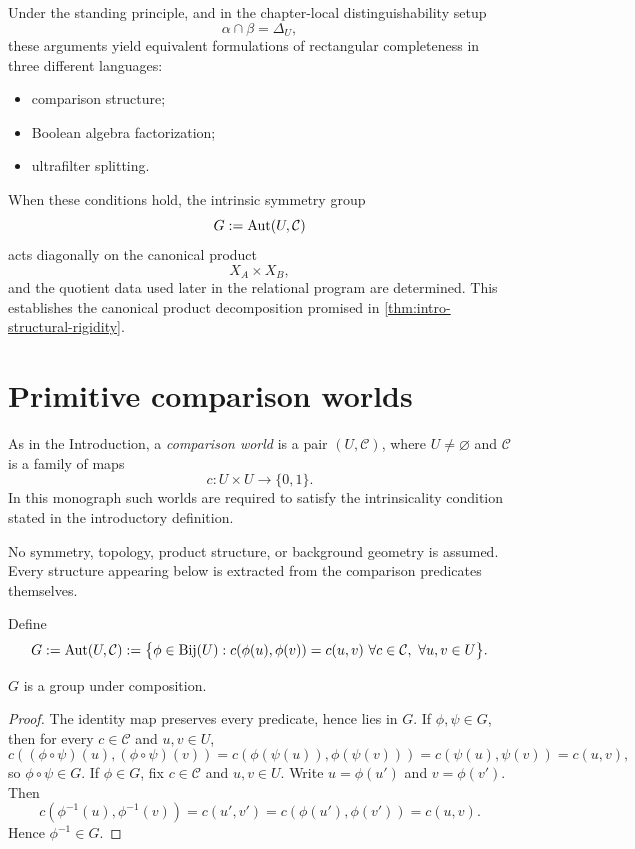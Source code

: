 Under the standing principle, and in the chapter-local
distinguishability setup
\[
	\alpha \cap \beta = \Delta_U,
\]
these arguments yield equivalent formulations of rectangular
completeness in three different languages:
\begin{itemize}
	\item comparison structure;
	\item Boolean algebra factorization;
	\item ultrafilter splitting.
\end{itemize}
When these conditions hold, the intrinsic symmetry group
\[
	G := \operatorname{Aut}(U,\mathcal C)
\]
acts diagonally on the canonical product
\[
	X_A \times X_B,
\]
and the quotient data used later in the relational program are determined.
This establishes the canonical product decomposition promised in
\cref{thm:intro-structural-rigidity}.
\section{Primitive comparison worlds}
\begin{definition}
	As in the Introduction, a \emph{comparison world} is a pair \((U,\mathcal C)\), where
	\(U\neq\varnothing\) and \(\mathcal C\) is a family of maps
	\[
		c:U\times U\to\{0,1\}.
	\]
	In this monograph such worlds are required to satisfy the intrinsicality
	condition stated in the introductory definition.
\end{definition}
\begin{remark}
	No symmetry, topology, product structure, or background geometry is
	assumed. Every structure appearing below is extracted from the
	comparison predicates themselves.
\end{remark}
\begin{definition}
	\label{def:intrinsic-symmetry-group}
	Define
	\[
		G:=\operatorname{Aut}(U,\mathcal C)
		:=
		\bigl\{
		\phi\in\operatorname{Bij}(U):
		c(\phi(u),\phi(v))=c(u,v)
		\ \forall c\in\mathcal C,\ \forall u,v\in U
		\bigr\}.
	\]
\end{definition}
\begin{proposition}
	\(G\) is a group under composition.
\end{proposition}
\begin{proof}
	The identity map preserves every predicate, hence lies in \(G\).
	If \(\phi,\psi\in G\), then for every \(c\in\mathcal C\) and
	\(u,v\in U\),
	\[
		c((\phi\circ\psi)(u),(\phi\circ\psi)(v))
		=
		c(\phi(\psi(u)),\phi(\psi(v)))
		=
		c(\psi(u),\psi(v))
		=
		c(u,v),
	\]
	so \(\phi\circ\psi\in G\).
	If \(\phi\in G\), fix \(c\in\mathcal C\) and \(u,v\in U\). Write
	\(u=\phi(u')\) and \(v=\phi(v')\). Then
	\[
		c(\phi^{-1}(u),\phi^{-1}(v))
		=
		c(u',v')
		=
		c(\phi(u'),\phi(v'))
		=
		c(u,v).
	\]
	Hence \(\phi^{-1}\in G\).
\end{proof}
